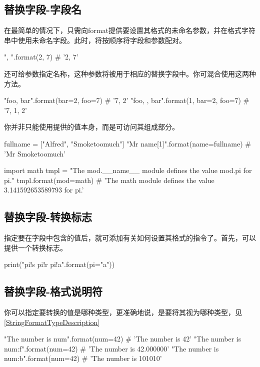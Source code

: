 \subsection{替换字段-字段名}
在最简单的情况下，只需向format提供要设置其格式的未命名参数，并在格式字符串中使用未命名字段。此时，将按顺序将字段和参数配对。
\begin{pyc}
"{}, {}".format(2, 7)  # '2, 7'
\end{pyc}
还可给参数指定名称，这种参数将被用于相应的替换字段中。你可混合使用这两种方法。
\begin{pyc}
"{foo}, {bar}".format(bar=2, foo=7)  # '7, 2' 
"{foo}, {}, {bar}".format(1, bar=2, foo=7)  # '7, 1, 2' 
\end{pyc}
你并非只能使用提供的值本身，而是可访问其组成部分。
\begin{pyc}
fullname = ["Alfred", "Smoketoomuch"]
"Mr {name[1]}".format(name=fullname)  # 'Mr Smoketoomuch'

import math
tmpl = "The {mod.__name__} module defines the value {mod.pi} for pi."
tmpl.format(mod=math)
# 'The math module defines the value 3.141592653589793 for pi.'
\end{pyc}
\subsection{替换字段-转换标志}
指定要在字段中包含的值后，就可添加有关如何设置其格式的指令了。首先，可以提供一个转换标志。
\begin{pyc}
print("{pi!s} {pi!r} {pi!a}".format(pi="a"))
\end{pyc}

\subsection{替换字段-格式说明符}
你可以指定要转换的值是哪种类型，更准确地说，是要将其视为哪种类型，见\autoref{StringFormatTypeDescription}
\begin{pyc}
"The number is {num}".format(num=42)  # 'The number is 42'
"The number is {num:f}".format(num=42)  # 'The number is 42.000000'
"The number is {num:b}".format(num=42)  # 'The number is 101010'
\end{pyc}

